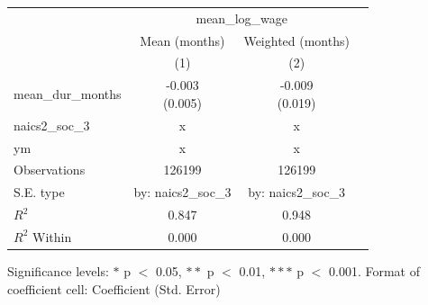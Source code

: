 \renewcommand\cellalign{t}
\begin{threeparttable}
\begin{tabular}{lccc}
\toprule
 & \multicolumn{2}{c}{mean_log_wage} \\
\cmidrule(lr){2-3} 
 & Mean (months) & Weighted (months) \\
 & (1) & (2) \\
\midrule
\addlinespace
mean_dur_months & \makecell{-0.003 \\ (0.005)} & \makecell{-0.009 \\ (0.019)} \\
\midrule
\addlinespace
naics2_soc_3 & x & x \\
ym & x & x \\
\midrule
\addlinespace
Observations & 126199 & 126199 \\
S.E. type & by: naics2_soc_3 & by: naics2_soc_3 \\
$R^2$ & 0.847 & 0.948 \\
$R^2$ Within & 0.000 & 0.000 \\
\bottomrule
\end{tabular}
\footnotesize Significance levels: $*$ p $<$ 0.05, $**$ p $<$ 0.01, $***$ p $<$ 0.001. Format of coefficient cell: Coefficient 
 (Std. Error)
\end{threeparttable}